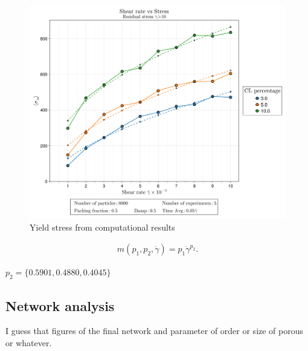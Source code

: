 \begin{figure}[ht!]
    \centering
    \includegraphics[width=\textwidth]{figs/ComputaitonalResults/yieldStress.png}
    \caption{Yield stress from computational results}
\end{figure}

\begin{gather}
    m(p_1,p_2,\dot{\gamma}) = p_1\dot{\gamma}^{p_2}.
\end{gather}

$p_2 = \{0.5901,0.4880,0.4045\}$

\subsection{Network analysis}

I guess that figures of the final network and parameter of order or size of porous or whatever.

